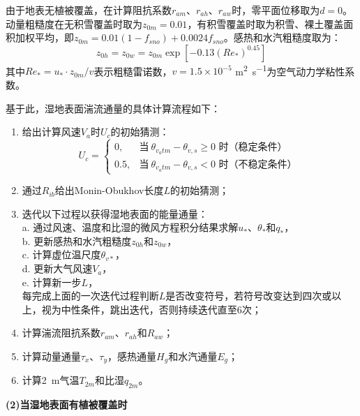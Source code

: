 由于地表无植被覆盖，在计算阻抗系数$r_{am}$、$r_{ah}$、$r_{aw}$时，零平面位移取为$d=0$。动量粗糙度在无积雪覆盖时取为$z_{0m}=0.01$，有积雪覆盖时取为积雪、裸土覆盖面积加权平均，即$z_{0m}=0.01 \left(1-f_{sno}\right)+0.0024 f_{sno}$。感热和水汽粗糙度取为：
\begin{equation}
    z_{0h}=z_{0w}=z_{0m}\exp{\left[-0.13\left(Re_*\right)^{0.45}\right]}
\end{equation}
其中$Re_*=u_*\cdot z_{0m}/v$表示粗糙雷诺数，$v= 1.5 \times 10^{-5}$ \unit{m^2.s^{-1}}为空气动力学粘性系数。

基于此，湿地表面湍流通量的具体计算流程如下：
\begin{enumerate}
    \item 给出计算风速$V_a$时$U_c$的初始猜测：
        \begin{equation}
            U_c = \begin{cases}
                0, &\text{当}\ \theta_{v_atm}-\theta_{v,s} \geqslant 0 \text{ 时（稳定条件）} \\
                0.5, &\text{当}\ \theta_{v_atm}-\theta_{v,s} < 0 \text{ 时（不稳定条件）}
            \end{cases}
        \end{equation}
    \item 通过$R_{ib}$给出Monin-Obukhov长度$L$的初始猜测；
    \item 迭代以下过程以获得湿地表面的能量通量：\\
        a. 通过风速、温度和比湿的微风方程积分结果求解$u_*$、$\theta_*$和$q_*$，\\
        b. 更新感热和水汽粗糙度$z_{0h}$和$z_{0w}$，\\
        c. 计算虚位温尺度$\theta_{v*}$，\\
        d. 更新大气风速$V_a$，\\
        e. 计算新一步$L$，\\
        每完成上面的一次迭代过程判断$L$是否改变符号，若符号改变达到四次或以上，视为中性条件，跳出迭代，否则持续迭代直至6次；
    \item 计算湍流阻抗系数$r_{am}$、$r_{ah}$和$R_{aw}$；
    \item 计算动量通量$\tau_x$、$\tau_y$，感热通量$H_g$和水汽通量$E_g$；
    \item 计算\qty{2}{m}气温$T_{2m}$和比湿$q_{2m}$。
\end{enumerate}

\textbf {(2)当湿地表面有植被覆盖时}\\

